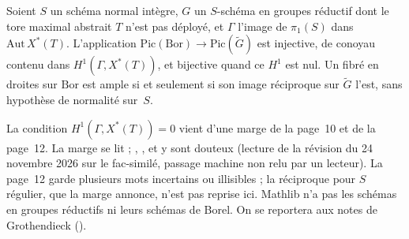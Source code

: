 \begin{encadre}
\begin{theoreme*}\nonverifie
Soient $S$ un schéma normal intègre, $G$ un $S$-schéma en groupes réductif dont le tore maximal abstrait $T$ n'est pas déployé, et $\Gamma$ l'image de $\pi_1(S)$ dans $\mathrm{Aut}\,X^*(T)$. L'application $\mathrm{Pic}(\mathrm{Bor}) \to \mathrm{Pic}(\tilde G)$ est injective, de conoyau contenu dans $H^1(\Gamma, X^*(T))$, et bijective quand ce $H^1$ est nul. Un fibré en droites sur $\mathrm{Bor}$ est ample si et seulement si son image réciproque sur $\tilde G$ l'est, sans hypothèse de normalité sur~$S$.
\end{theoreme*}
\end{encadre}
{\small La condition $H^1(\Gamma, X^*(T)) = 0$ vient d'une marge de la page~10 et de la page~12. La marge se lit  ; , ,  et  y sont douteux (lecture de la révision du 24 novembre 2026 sur le fac-similé, passage machine non relu par un lecteur). La page~12 garde plusieurs mots incertains ou illisibles ; la réciproque pour $S$ régulier, que la marge annonce, n'est pas reprise ici. Mathlib n'a pas les schémas en groupes réductifs ni leurs schémas de Borel. On se reportera aux notes de Grothendieck ().\par}


